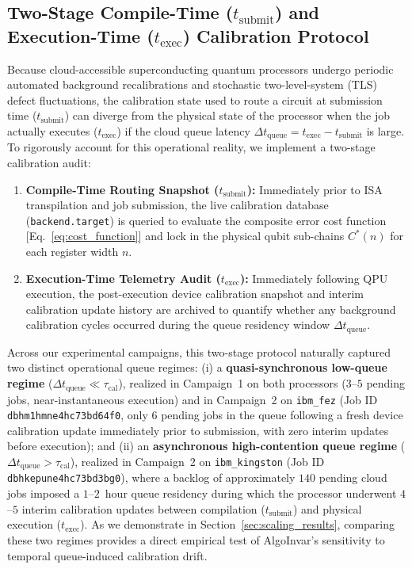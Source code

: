 \documentclass[aps,pra,reprint,superscriptaddress,floatfix,nofootinbib]{revtex4-2}
\begin{document}
\subsection{Two-Stage Compile-Time (\texorpdfstring{$t_{\text{submit}}$}{t\_submit}) and Execution-Time (\texorpdfstring{$t_{\text{exec}}$}{t\_exec}) Calibration Protocol}
\label{sec:two_stage_calibration}
Because cloud-accessible superconducting quantum processors undergo periodic automated background recalibrations and stochastic two-level-system (TLS) defect fluctuations, the calibration state used to route a circuit at submission time ($t_{\text{submit}}$) can diverge from the physical state of the processor when the job actually executes ($t_{\text{exec}}$) if the cloud queue latency $\Delta t_{\text{queue}} = t_{\text{exec}} - t_{\text{submit}}$ is large. To rigorously account for this operational reality, we implement a two-stage calibration audit:
\begin{enumerate}
    \item \textbf{Compile-Time Routing Snapshot ($t_{\text{submit}}$):} Immediately prior to ISA transpilation and job submission, the live calibration database (\texttt{backend.target}) is queried to evaluate the composite error cost function [Eq.~\eqref{eq:cost_function}] and lock in the physical qubit sub-chains $C^*(n)$ for each register width $n$.
    \item \textbf{Execution-Time Telemetry Audit ($t_{\text{exec}}$):} Immediately following QPU execution, the post-execution device calibration snapshot and interim calibration update history are archived to quantify whether any background calibration cycles occurred during the queue residency window $\Delta t_{\text{queue}}$.
\end{enumerate}
Across our experimental campaigns, this two-stage protocol naturally captured two distinct operational queue regimes: (i) a \textbf{quasi-synchronous low-queue regime} ($\Delta t_{\text{queue}} \ll \tau_{\text{cal}}$), realized in Campaign~1 on both processors ($3$--$5$ pending jobs, near-instantaneous execution) and in Campaign~2 on \texttt{ibm\_fez} (Job ID \texttt{dbhm1hmne4hc73bd64f0}, only $6$ pending jobs in the queue following a fresh device calibration update immediately prior to submission, with zero interim updates before execution); and (ii) an \textbf{asynchronous high-contention queue regime} ($\Delta t_{\text{queue}} > \tau_{\text{cal}}$), realized in Campaign~2 on \texttt{ibm\_kingston} (Job ID \texttt{dbhkepune4hc73bd3bg0}), where a backlog of approximately $140$ pending cloud jobs imposed a $1$--$2$~hour queue residency during which the processor underwent $4$--$5$ interim calibration updates between compilation ($t_{\text{submit}}$) and physical execution ($t_{\text{exec}}$). As we demonstrate in Section~\ref{sec:scaling_results}, comparing these two regimes provides a direct empirical test of AlgoInvar's sensitivity to temporal queue-induced calibration drift.
\end{document}
